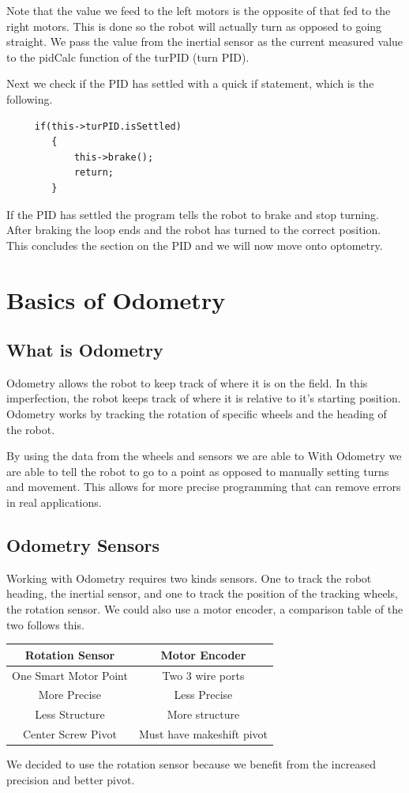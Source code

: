 \documentclass[12pt]{article}
\begin{document}
    Note that the value we feed to the left motors is the opposite of that fed to the right motors. This is done so the robot will actually turn as opposed to going straight. We pass the value from the inertial sensor as the current measured value to the pidCalc function of the turPID (turn PID).

    Next we check if the PID has settled with a quick if statement, which is the following.
    \begin{verbatim}
     if(this->turPID.isSettled)
        {
            this->brake();
            return;
        }
    \end{verbatim}

    If the PID has settled the program tells the robot to brake and stop turning. After braking the loop ends and the robot has turned to the correct position. This concludes the section on the PID and we will now move onto optometry.


\pagebreak
\section{Basics of Odometry}
\subsection{What is Odometry}
    Odometry allows the robot to keep track of where it is on the field. In this imperfection, the robot keeps track of where it is relative to it's starting position. Odometry works by tracking the rotation of specific wheels and the heading of the robot.

    By using the data from the wheels and sensors we are able to
    With Odometry we are able to tell the robot to go to a point as opposed to manually setting turns and movement. This allows for more precise programming that can remove errors in real applications.

\subsection{Odometry Sensors}
    Working with Odometry requires two kinds sensors. One to track the robot heading, the inertial sensor, and one to track the position of the tracking wheels, the rotation sensor. We could also use a motor encoder, a comparison table of the two follows this.
    \begin{center}
        \begin{tabular}{c|c}
            Rotation Sensor & Motor Encoder \\
            \hline
            One Smart Motor Point & Two 3 wire ports \\
            More Precise & Less Precise \\
            Less Structure & More structure \\
            Center Screw Pivot & Must have makeshift pivot \\
        \end{tabular}

        We decided to use the rotation sensor because we benefit from the increased precision and better pivot.
    \end{center}
\end{document}

